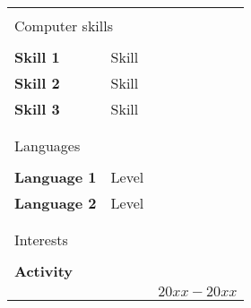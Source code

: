 \documentclass[fontsize=12pt]{article}
\newcommand{\emptyLine}{\\[-0.2cm]}
\newcommand{\bulletpoint}{\hspace*{\labelsep}\textbullet\hspace*{\labelsep}}
\newcommand{\simpleEntry}[1]{\multicolumn{2}{l}{#1}}
\newcommand{\sectionTitle}[1]{\emptyLine\emptyLine\simpleEntry{\Large{#1}}}
\newcommand{\titleEntry}[1]{\emptyLine\simpleEntry{\textbf{#1}}}
\newcommand{\indentedEntry}[1]{\simpleEntry{\hspace{0.2cm}{#1}}}
\newcommand{\bulletpointEntry}[1]{\indentedEntry{\bulletpoint{#1}}}
\begin{document}
\begin{tabular}{p{5cm}lr}
\sectionTitle{Computer skills} \\ \hline 
 \emptyLine
 {\textbf{Skill 1}} & Skill \\
 {\textbf{Skill 2}} & Skill \\
 {\textbf{Skill 3}} & Skill \\
\sectionTitle{Languages} \\ \hline
 \emptyLine
 {\textbf{Language 1}} & Level \\
 {\textbf{Language 2}} & Level \\
\sectionTitle{Interests} \\ \hline 
 \titleEntry{Activity} \\
  \bulletpointEntry{\lipsum[1][1]} & $20xx-20xx$ \\
\end{tabular}
\end{document}

